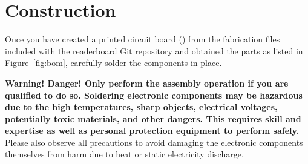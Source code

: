 \section{Construction}
Once you have created a printed circuit board () from the fabrication files included with the
readerboard Git repository and obtained the parts as listed in Figure~\ref{fig:bom}, carefully solder the components
in place. 

{\bfseries Warning! Danger! Only perform the assembly operation if you are qualified to do so. Soldering electronic components
may be hazardous due to the high temperatures, sharp objects, electrical voltages, potentially toxic materials,
and other dangers. This requires skill and expertise as well as personal protection equipment to perform safely.}
Please also observe all precautions to avoid damaging the electronic components themselves from harm due to
heat or static electricity discharge.
\newcommand\mouser[1]{{\sffamily\footnotesize#1}}
